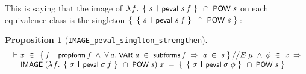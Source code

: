 \documentclass[letterpaper]{article}
\newtheorem{prop}{Proposition}
\renewcommand{\HOLConst}[1]{{\textsf{\upshape\small #1}}}
\renewcommand{\HOLinline}[1]{\ensuremath{#1}}
\newenvironment{holmath}{\begin{displaymath}\begin{array}{l}}{\end{array}\end{displaymath}\ignorespacesafterend}
\begin{document}
This is saying that the image of \HOLinline{\HOLTokenLambda{}\HOLBoundVar{f}.\;\HOLTokenLeftbrace{}\HOLBoundVar{s}\;\HOLTokenBar{}\;\HOLConst{peval}\;\HOLBoundVar{s}\;\HOLBoundVar{f}\HOLTokenRightbrace{}\;\HOLSymConst{\HOLTokenInter{}}\;\HOLConst{POW}\;\HOLFreeVar{s}} on each equivalence class is the singleton \HOLinline{\HOLTokenLeftbrace{}\HOLTokenLeftbrace{}\HOLBoundVar{s}\;\HOLTokenBar{}\;\HOLConst{peval}\;\HOLBoundVar{s}\;\HOLFreeVar{f}\HOLTokenRightbrace{}\;\HOLSymConst{\HOLTokenInter{}}\;\HOLConst{POW}\;\HOLFreeVar{s}\HOLTokenRightbrace{}}:
\begin{prop}[\texttt{IMAGE_peval_singlton_strengthen}]
\begin{holmath}
  \ensuremath{\HOLTokenTurnstile}\HOLFreeVar{x}\;\HOLSymConst{\HOLTokenIn{}}\;\HOLTokenLeftbrace{}\HOLBoundVar{f}\;\HOLTokenBar{}\;\HOLConst{propform}\;\HOLBoundVar{f}\;\HOLSymConst{\HOLTokenConj{}}\;\HOLSymConst{\HOLTokenForall{}}\HOLBoundVar{a}.\;\HOLConst{VAR}\;\HOLBoundVar{a}\;\HOLSymConst{\HOLTokenIn{}}\;\HOLConst{subforms}\;\HOLBoundVar{f}\;\HOLSymConst{\HOLTokenImp{}}\;\HOLBoundVar{a}\;\HOLSymConst{\HOLTokenIn{}}\;\HOLFreeVar{s}\HOLTokenRightbrace{}\HOLSymConst{//E}\;\HOLFreeVar{\ensuremath{\mu}}\;\HOLSymConst{\HOLTokenConj{}}\;\HOLFreeVar{\ensuremath{\phi}}\;\HOLSymConst{\HOLTokenIn{}}\;\HOLFreeVar{x}\;\HOLSymConst{\HOLTokenImp{}}\\
\;\;\;\;\;\HOLConst{IMAGE}\;(\HOLTokenLambda{}\HOLBoundVar{f}.\;\HOLTokenLeftbrace{}\HOLBoundVar{\ensuremath{\sigma}}\;\HOLTokenBar{}\;\HOLConst{peval}\;\HOLBoundVar{\ensuremath{\sigma}}\;\HOLBoundVar{f}\HOLTokenRightbrace{}\;\HOLSymConst{\HOLTokenInter{}}\;\HOLConst{POW}\;\HOLFreeVar{s})\;\HOLFreeVar{x}\;\HOLSymConst{=}\;\HOLTokenLeftbrace{}\HOLTokenLeftbrace{}\HOLBoundVar{\ensuremath{\sigma}}\;\HOLTokenBar{}\;\HOLConst{peval}\;\HOLBoundVar{\ensuremath{\sigma}}\;\HOLFreeVar{\ensuremath{\phi}}\HOLTokenRightbrace{}\;\HOLSymConst{\HOLTokenInter{}}\;\HOLConst{POW}\;\HOLFreeVar{s}\HOLTokenRightbrace{}
\end{holmath}
\end{prop}
\end{document}
